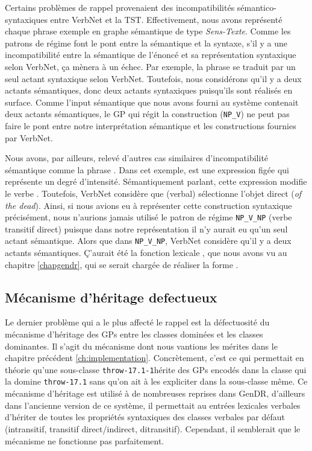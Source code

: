 Certains problèmes de rappel provenaient des incompatibilités sémantico-syntaxiques entre VerbNet et la \ac{TST}. Effectivement, nous avons représenté chaque phrase exemple en graphe sémantique de type \emph{Sens-Texte}. Comme les patrons de régime font le pont entre la sémantique et la syntaxe, s'il y a une incompatibilité entre la sémantique de l'énoncé et sa représentation syntaxique selon VerbNet, ça mènera à un échec. Par exemple, la phrase  se traduit par un seul actant syntaxique selon VerbNet. Toutefois, nous considérons qu'il y a deux actants sémantiques, donc deux actants syntaxiques puisqu'ils sont réalisés en surface. Comme l'input sémantique que nous avons fourni au système contenait deux actants sémantiques, le \ac{GP} qui régit la construction (\texttt{NP\_V}) ne peut pas faire le pont entre notre interprétation sémantique et les constructions fournies par VerbNet. 

Nous avons, par ailleurs, relevé d'autres cas similaires d'incompatibilité sémantique comme la phrase . Dans cet exemple,  est une expression figée qui représente un degré d'intensité. Sémantiquement parlant, cette expression modifie le verbe . Toutefois, VerbNet considère que (verbal) sélectionne l'objet direct  (\emph{of the dead}). Ainsi, si nous avions eu à représenter cette construction syntaxique précisément, nous n'aurions jamais utilisé le patron de régime \texttt{NP\_V\_NP} (verbe transitif direct) puisque dans notre représentation il n'y aurait eu qu'un seul actant sémantique. Alors que dans \texttt{NP\_V\_NP}, VerbNet considère qu'il y a deux actants sémantiques. Ç'aurait été la fonction lexicale , que nous avons vu au chapitre \ref{chapgendr}, qui se serait chargée de réaliser la forme .

\subsection{Mécanisme d'héritage defectueux}
Le dernier problème qui a le plus affecté le rappel est la défectuosité du mécanisme d'héritage des \acp{GP} entre les classes dominées et les classes dominantes. Il s'agit du mécanisme dont nous vantions les mérites dans le chapitre précédent \ref{ch:implementation}. Concrètement, c'est ce qui permettait en théorie qu'une sous-classe \texttt{throw-17.1-1}hérite des \acp{GP} encodés dans la classe qui la domine \texttt{throw-17.1} sans qu'on ait à les expliciter dans la sous-classe même. Ce mécanisme d'héritage est utilisé à de nombreuses reprises dans GenDR, d'ailleurs dans l'ancienne version de ce système, il permettait au entrées lexicales verbales d'hériter de toutes les propriétés syntaxiques des classes verbales par défaut (intransitif, transitif direct/indirect, ditransitif). Cependant, il semblerait que le mécanisme ne fonctionne pas parfaitement.

